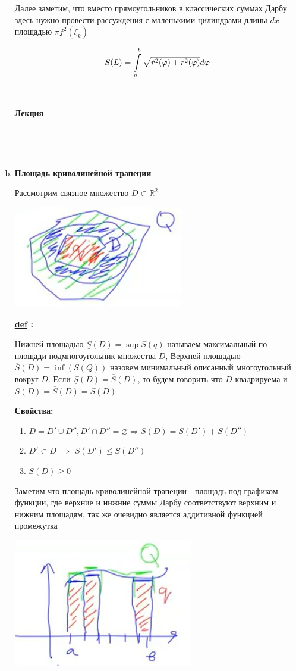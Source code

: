 \documentclass[a4paper,11pt]{article}
\renewcommand{\phi}{\ensuremath{\varphi}}
\newcounter{lecture}
\newcommand{\lecture}{ \noindent
\noindent \LARGE \textbf{
Лекция \thelecture  
\stepcounter{lecture}} \large 

\

}
\newcommand{\Def}[1]{ 
\noindent\makebox[\linewidth]{\rule{\textwidth}{1pt}} 

 \noindent \textbf{\underline{def} :}
#1 

\noindent\makebox[\linewidth]{\rule{\textwidth}{1pt}} }
\newcommand{\R}{\mathbb{R}}
\newcommand{\formula}[1]{
\begin{myquote} 
	\centering
	\begin{equation}
	{#1}
	\end{equation}
\end{myquote}
 }
\begin{document}
\begin{enumerate}[a)]
Далее заметим, что вместо прямоугольников в классических суммах Дарбу здесь нужно провести рассуждения с маленькими цилиндрами длины $dx$ площадью $\pi f^2(\xi_k)$
\formula{\label{eq:polar}
S(L) = \int\limits_a^b \sqrt{\dot{r}^2(\phi) + r^2(\phi)} d\phi
}

\

\lecture

\

\item \textbf{Площадь криволинейной трапеции}

Рассмотрим связное множество $D\subset \R^2$

\includegraphics{curveD.jpg}

\Def
{
Нижней площадью $\underline{S}(D) = \sup S(q)$ называем максимальный по площади подмногоугольник множества $D$, Верхней площадью $\overline{S}(D) = \inf (S(Q))$  назовем минимальный описанный многоугольный вокруг $D$. Если $\underline{S}(D) = \overline{S}(D) $, то будем говорить что $D$ квадрируема и $S(D) = \overline{S}(D) = \underline{S}(D)$
}

\textbf{Свойства:}
\begin{enumerate}[1)]
	\item $D = D'\cup D'', D'\cap D'' = \varnothing \Rightarrow S(D) = S(D') + S(D'')$
	\item $D'\subset D$ $\Rightarrow$ $S(D') \leq S(D'')$
	\item $S(D) \geq 0$
\end{enumerate}

Заметим что площадь криволинейной трапеции - площадь под графиком функции, где верхние и нижние суммы Дарбу соответствуют верхним и нижним площадям, так же очевидно является аддитивной функцией промежутка

\includegraphics{сurvefunc.jpg}


\end{enumerate}
\end{document}
